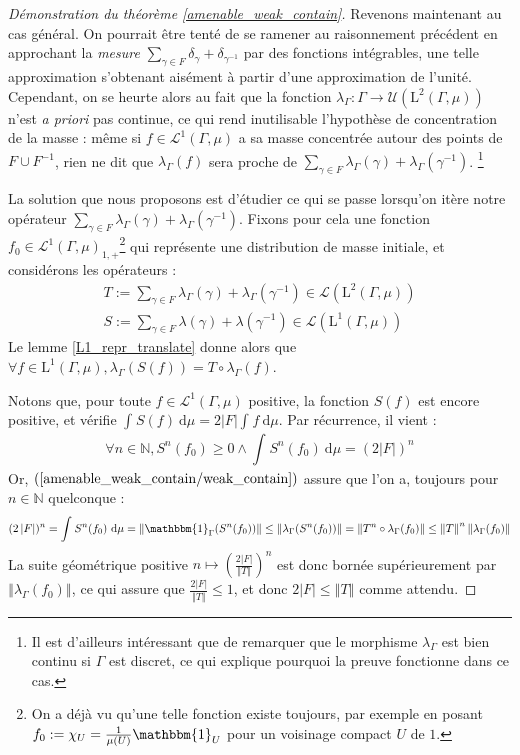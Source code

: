 \documentclass[a4paper,12pt]{article}
\newcommand{\N}{\mathbb{N}}
\newcommand{\norm}[1]{\left\Vert #1\right\Vert}
\newcommand{\abs}[1]{\left\vert#1\right\vert}
\newcommand{\card}[1]{\abs{#1}}
\newcommand{\indic}{\mathbbm{1}}
\newcommand{\integral}[4]{\int_{#1}^{#2} #3~\mathrm{d}#4}
\newcommand{\inv}{^{-1}}
\newcommand{\comp}{\circ}
\begin{document}
\begin{proof}[Démonstration du théorème \ref{amenable_weak_contain}]
    Revenons maintenant au cas général. On pourrait être tenté de se ramener au raisonnement précédent 
    en approchant la \emph{mesure} $\sum_{\gamma\in F}\delta_\gamma + \delta_{\gamma\inv}$ par des fonctions intégrables,
    une telle approximation s'obtenant aisément à partir d'une approximation de l'unité. Cependant,
    on se heurte alors au fait que la fonction $\lambda_\Gamma : \Gamma \to \mathcal{U}(\mathrm{L}^2(\Gamma, \mu))$
    n'est \emph{a priori} pas continue, ce qui rend inutilisable l'hypothèse de concentration de la masse : 
    même si $f\in\mathscr{L}^1(\Gamma, \mu)$ a sa masse concentrée autour des points de $F\cup F\inv$,
    rien ne dit que $\lambda_\Gamma(f)$ sera proche de $\sum_{\gamma\in F}\lambda_\Gamma(\gamma) + \lambda_\Gamma(\gamma\inv)$. 
    \footnote{Il est d'ailleurs intéressant que de remarquer que le morphisme $\lambda_\Gamma$ est bien continu
    si $\Gamma$ est discret, ce qui explique pourquoi la preuve fonctionne dans ce cas.}

    La solution que nous proposons est d'étudier ce qui se passe lorsqu'on itère notre opérateur $\sum_{\gamma\in F}\lambda_\Gamma(\gamma) + \lambda_\Gamma(\gamma\inv)$.
    Fixons pour cela une fonction $f_0\in\mathscr{L}^1(\Gamma, \mu)_{1, +}$\footnote{On a déjà vu qu'une telle fonction existe toujours, par exemple en posant $f_0:=\chi_U=\frac{1}{\mu(U)}\indic_U$ pour 
    un voisinage compact $U$ de $1$.} qui représente une distribution de masse initiale, et considérons les opérateurs : 
    \begin{gather*}
        T := \sum_{\gamma\in F}\lambda_\Gamma(\gamma) + \lambda_\Gamma(\gamma\inv) \in\mathcal{L}(\mathrm{L}^2(\Gamma, \mu)) \\
        S := \sum_{\gamma\in F}\lambda(\gamma) + \lambda(\gamma\inv) \in \mathcal{L}(\mathrm{L}^1(\Gamma, \mu))
    \end{gather*}
    Le lemme \ref{L1_repr_translate} donne alors que $\forall f\in\mathrm{L}^1(\Gamma, \mu), \lambda_\Gamma(S(f)) = T \comp \lambda_\Gamma(f)$.

    Notons que, pour toute $f\in\mathscr{L}^1(\Gamma, \mu)$ positive, la fonction $S(f)$ est encore positive, et vérifie $\integral{}{}{S(f)}{\mu} = 2\card{F}\integral{}{}{f}{\mu}$.
    Par récurrence, il vient : 
    \begin{equation*}
        \forall n\in\N, S^n(f_0)\geq0 \land \integral{}{}{S^n(f_0)}{\mu} = (2\card{F})^n
    \end{equation*}
    Or, $(\ref{amenable_weak_contain/weak_contain})$
    assure que l'on a, toujours pour $n\in\N$ quelconque :
    \begin{equation*}
        (2\card{F})^n = \integral{}{}{S^n(f_0)}{\mu} = \norm{\indic_\Gamma(S^n(f_0))} \leq \norm{\lambda_\Gamma(S^n(f_0))} = \norm{T^n \comp \lambda_\Gamma(f_0)} \le \norm{T}^n \norm{\lambda_\Gamma(f_0)}
    \end{equation*}
    La suite géométrique positive $n\mapsto\left(\frac{2\card{F}}{\norm{T}}\right)^n$ est donc bornée supérieurement par $\norm{\lambda_\Gamma(f_0)}$, ce qui assure que $\frac{2\card{F}}{\norm{T}} \leq 1$,
    et donc $2\card{F}\leq\norm{T}$ comme attendu.


\end{proof}
\end{document}
